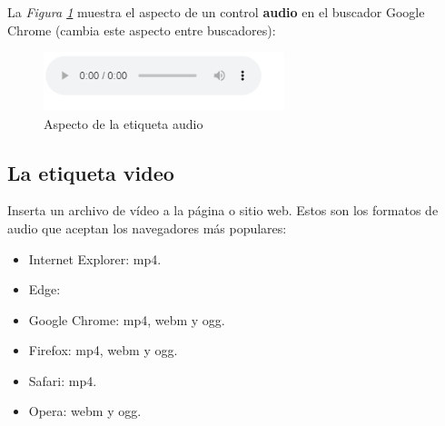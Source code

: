 La \textit{Figura \ref{fig: 15}} muestra el aspecto de un control \textbf{audio} en el buscador Google Chrome (cambia este aspecto entre buscadores):
\begin{figure}[H]
    \centering
    \caption{Aspecto de la etiqueta audio}
    \label{fig: 15}
    \includegraphics[width=7cm]{ss_html/audio.png}
\end{figure}


\subsection{La etiqueta video}
\hspace{0.55cm}Inserta un archivo de vídeo a la página o sitio web. Estos son los formatos de audio que aceptan los navegadores más populares:
\begin{itemize}
    \item Internet Explorer: mp4.
    \item Edge: 
    \item Google Chrome: mp4, webm y ogg.
    \item Firefox: mp4, webm y ogg.
    \item Safari: mp4.
    \item Opera: webm y ogg.
\end{itemize}

